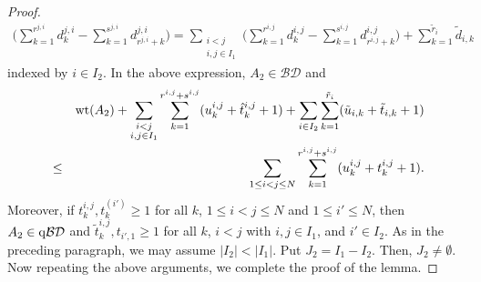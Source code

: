 \documentclass[12pt, reqno]{amsart}
\theoremstyle{definition}
\theoremstyle{remark}
\numberwithin{equation}{section}
\newcommand{\BD}{\mathcal {BD}}
\newcommand{\qBD}{{\rm q}{\mathcal {BD}}}
\newcommand{\w}{\tilde}
\numberwithin{equation}{section}
\begin{document}
\begin{proof}
\begin{eqnarray}
  \bigg (\sum_{k=1}^{r^{j,i}} d_k^{j,i} 
    - \sum_{k=1}^{s^{j,i}} d_{r^{j,i}+k}^{j,i} \bigg )
= \sum_{\substack{i < j\\i, j \in I_1}} 
  \bigg (\sum_{k=1}^{r^{i,j}} d_k^{i,j} 
    - \sum_{k=1}^{s^{i,j}} d_{r^{i,j}+k}^{i,j} \bigg )
  + \sum_{k=1}^{\w r_i} \w d_{i,k}
\end{eqnarray}
indexed by $i \in I_2$. In the above expression, $A_2 \in \BD$ and 
\begin{eqnarray*}
& &{\rm wt}(A_2) 
   + \sum_{\substack{i < j\\i, j \in I_1}} \sum_{k=1}^{r^{i,j}+s^{i,j}} 
   (u_k^{i,j} + \hat t_k^{i,j} + 1)
   + \sum_{i \in I_2} \sum_{k=1}^{\w r_i} (\w u_{i,k} + \w t_{i,k} + 1)  \\
&\le&\sum_{1 \le i < j \le N} \sum_{k=1}^{r^{i,j}+s^{i,j}} 
   (u_k^{i,j} + t_k^{i,j} + 1).
\end{eqnarray*}
Moreover, if $t_k^{i,j}, t_k^{(i')} \ge 1$ for all $k$, 
$1 \le i < j \le N$ and $1 \le i' \le N$,
then $A_2 \in \qBD$ and $\w t_k^{i,j}, t_{i',1} \ge 1$ 
for all $k$, $i < j$ with $i,j \in I_1$, and $i' \in I_2$. 
As in the preceding paragraph, we may assume $|I_2| < |I_1|$. 
Put $J_2 = I_1 - I_2$. Then, $J_2 \ne \emptyset$.
Now repeating the above arguments, we complete the proof of the lemma.
\end{proof}
\end{document}
